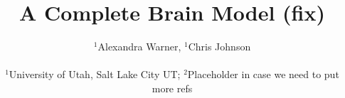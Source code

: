 \documentclass[11pt]{article}
\begin{document}
\title{A Complete Brain Model (fix)}
\author{$^1$Alexandra Warner, $^1$Chris Johnson\\ \\
$^{1}$University of Utah, Salt Lake City UT; $^{2}$Placeholder in case we need to put more refs}
\maketitle

%








\newpage


\end{document}
